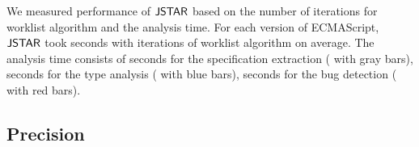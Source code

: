 We measured performance of $\tool$ based on the number of iterations for
worklist algorithm and the analysis time.  For each version of ECMAScript,
$\tool$ took  seconds with  iterations of worklist
algorithm on average.  The analysis time consists of  seconds for
the specification extraction ( with gray bars), 
seconds for the type analysis ( with blue bars), 
seconds for the bug detection ( with red bars).


\subsection{Precision}\label{sec:precision}

\begin{table}
  \centering
  \caption{The creators and resolvers of true bugs.}
  \label{table:author}
  \vspace*{-1.5em}
\end{table}

